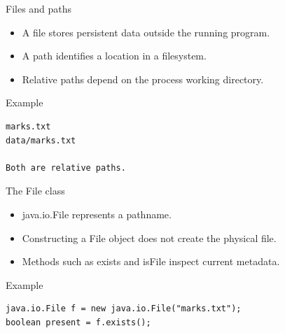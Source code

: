 \documentclass[10pt,aspectratio=169]{beamer}
\begin{document}
\begin{frame}[fragile,t]{Files and paths}
\begin{itemize}
\item A file stores persistent data outside the running program.
\item A path identifies a location in a filesystem.
\item Relative paths depend on the process working directory.
\end{itemize}
\vspace{1mm}\begin{block}{Example}
\begin{lstlisting}
marks.txt
data/marks.txt

Both are relative paths.
\end{lstlisting}
\end{block}
\end{frame}

\begin{frame}[fragile,t]{The File class}
\begin{itemize}
\item java.io.File represents a pathname.
\item Constructing a File object does not create the physical file.
\item Methods such as exists and isFile inspect current metadata.
\end{itemize}
\vspace{1mm}\begin{block}{Example}
\begin{lstlisting}
java.io.File f = new java.io.File("marks.txt");
boolean present = f.exists();
\end{lstlisting}
\end{block}
\end{frame}
\end{document}

